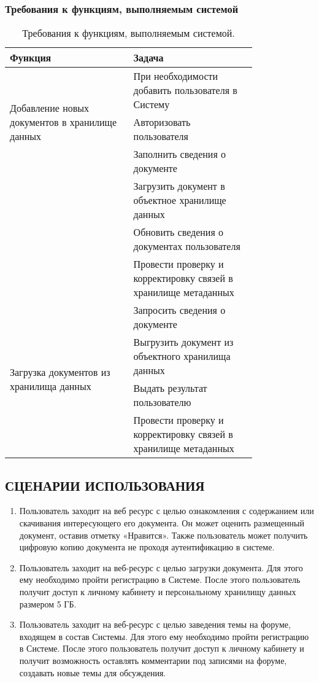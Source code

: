 \documentclass[a4paper,14pt]{extarticle}
\begin{document}
\subsubsection{Требования к функциям, выполняемым системой}
\begin{table}[h!]
	\caption{\label{tab:functions} Требования к функциям, выполняемым системой.}
	\begin{center}\small
		\begin{tabular}{|m{0.4\linewidth}|m{0.4\linewidth}|}
			\hline
			\textbf{Функция} & \textbf{Задача}\\
			\hline
			\multirow{3}{0.95\linewidth}{Добавление новых документов в хранилище данных} 
			& При необходимости добавить пользователя в Систему  \\\cline{2-2}
			& Авторизовать пользователя \\\cline{2-2}
			& Заполнить сведения о документе \\\cline{2-2}
			& Загрузить документ в объектное хранилище данных \\\cline{2-2}
			& Обновить сведения о документах пользователя \\\cline{2-2}
			& Провести проверку и корректировку связей в хранилище метаданных \\\hline
			
			\multirow{4}{0.95\linewidth}{Загрузка документов из хранилища данных} 
			& Запросить сведения о документе \\\cline{2-2}
			& Выгрузить документ из объектного хранилища данных \\\cline{2-2}
			& Выдать результат пользователю \\\cline{2-2}
			& Провести проверку и корректировку связей в хранилище метаданных \\\hline
		\end{tabular}
	\end{center}
\end{table}
\newpage
\subsection{СЦЕНАРИИ ИСПОЛЬЗОВАНИЯ}


\begin{enumerate}
	\item Пользователь заходит на веб ресурс с целью ознакомления с содержанием или скачивания интересующего его документа. Он может оценить размещенный документ, оставив отметку «Нравится». Также пользователь может получить цифровую копию документа не проходя аутентификацию в системе. 
	\item Пользователь заходит на веб-ресурс с целью загрузки документа. Для этого ему необходимо пройти регистрацию в Системе. После этого пользователь получит доступ к личному кабинету и персональному хранилищу данных размером 5 ГБ.
	\item Пользователь заходит на веб-ресурс с целью заведения темы на форуме, входящем в состав Системы. Для этого ему необходимо пройти регистрацию в Системе. После этого пользователь получит доступ к личному кабинету и получит возможность оставлять комментарии под записями на форуме, создавать новые темы для обсуждения.
\end{enumerate}
\end{document}
